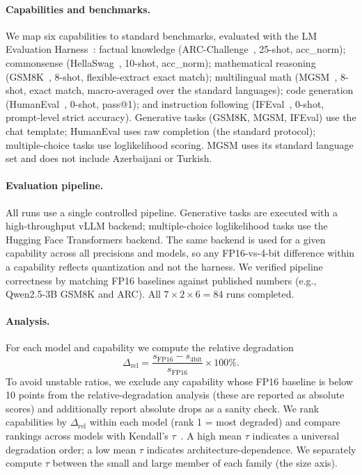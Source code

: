 \documentclass[11pt]{article}
\begin{document}
\paragraph{Capabilities and benchmarks.} We map six capabilities to standard
benchmarks, evaluated with the LM Evaluation Harness~\citep{lmeval}: factual
knowledge (ARC-Challenge~\citep{clark2018arc}, 25-shot, acc\_norm); commonsense
(HellaSwag~\citep{zellers2019hellaswag}, 10-shot, acc\_norm); mathematical
reasoning (GSM8K~\citep{cobbe2021gsm8k}, 8-shot, flexible-extract exact match);
multilingual math (MGSM~\citep{shi2022mgsm}, 8-shot, exact match, macro-averaged
over the standard languages); code generation
(HumanEval~\citep{chen2021humaneval}, 0-shot, pass@1); and instruction following
(IFEval~\citep{zhou2023ifeval}, 0-shot, prompt-level strict accuracy). Generative
tasks (GSM8K, MGSM, IFEval) use the chat template; HumanEval uses raw completion
(the standard protocol); multiple-choice tasks use loglikelihood scoring. MGSM
uses its standard language set and does not include Azerbaijani or Turkish.

\paragraph{Evaluation pipeline.} All runs use a single controlled pipeline.
Generative tasks are executed with a high-throughput vLLM backend; multiple-choice
loglikelihood tasks use the Hugging Face Transformers backend. The same backend is
used for a given capability across all precisions and models, so any
FP16-vs-4-bit difference within a capability reflects quantization and not the
harness. We verified pipeline correctness by matching FP16 baselines against
published numbers (e.g., Qwen2.5-3B GSM8K and ARC). All $7\times2\times6=84$ runs
completed.

\paragraph{Analysis.} For each model and capability we compute the relative
degradation
\[
\Delta_{\text{rel}} = \frac{s_{\text{FP16}} - s_{\text{4bit}}}{s_{\text{FP16}}}\times 100\%.
\]
To avoid unstable ratios, we exclude any capability whose FP16 baseline is below
10 points from the relative-degradation analysis (these are reported as absolute
scores) and additionally report absolute drops as a sanity check. We rank
capabilities by $\Delta_{\text{rel}}$ within each model (rank 1 = most degraded)
and compare rankings across models with Kendall's $\tau$~\citep{kendall1938tau}.
A high mean $\tau$ indicates a universal degradation order; a low mean $\tau$
indicates architecture-dependence. We separately compute $\tau$ between the small
and large member of each family (the size axis).
\end{document}
